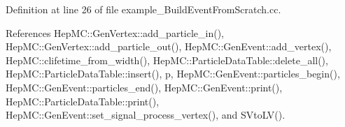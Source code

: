 Definition at line 26 of file example\_\-Build\-Event\-From\-Scratch.cc.

References Hep\-MC::Gen\-Vertex::add\_\-particle\_\-in(), Hep\-MC::Gen\-Vertex::add\_\-particle\_\-out(), Hep\-MC::Gen\-Event::add\_\-vertex(), Hep\-MC::clifetime\_\-from\_\-width(), Hep\-MC::Particle\-Data\-Table::delete\_\-all(), Hep\-MC::Particle\-Data\-Table::insert(), p, Hep\-MC::Gen\-Event::particles\_\-begin(), Hep\-MC::Gen\-Event::particles\_\-end(), Hep\-MC::Gen\-Event::print(), Hep\-MC::Particle\-Data\-Table::print(), Hep\-MC::Gen\-Event::set\_\-signal\_\-process\_\-vertex(), and SVto\-LV().